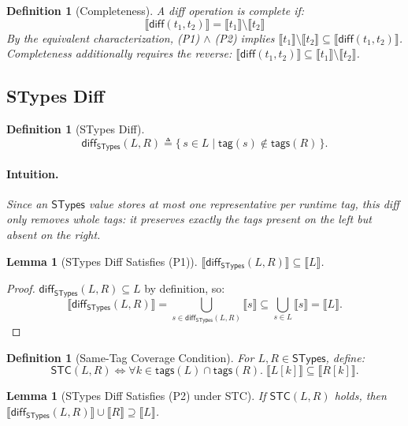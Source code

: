 \documentclass[11pt]{article}
\newtheorem{lemma}[theorem]{Lemma}
\newtheorem{definition}[theorem]{Definition}
\newcommand{\sem}[1]{\llbracket #1 \rrbracket}
\newcommand{\diff}{\mathsf{diff}}
\newcommand{\STypes}{\mathsf{STypes}}
\newcommand{\tagfn}{\mathsf{tag}}
\newcommand{\tags}{\mathsf{tags}}
\begin{document}
\begin{definition}[Completeness]
A diff operation is \emph{complete} if:
\[
\sem{\diff(t_1, t_2)} = \sem{t_1} \setminus \sem{t_2}
\]
By the equivalent characterization, (P1) $\land$ (P2) implies 
$\sem{t_1} \setminus \sem{t_2} \subseteq \sem{\diff(t_1, t_2)}$.
Completeness additionally requires the reverse: $\sem{\diff(t_1, t_2)} \subseteq \sem{t_1} \setminus \sem{t_2}$.
\end{definition}

\subsection{STypes Diff}

\begin{definition}[STypes Diff]
\label{def:stypes-diff}
\[
\diff_{\STypes}(L, R) \triangleq \{\, s \in L \mid \tagfn(s) \notin \tags(R)\,\}.
\]
\paragraph{Intuition.}
Since an $\STypes$ value stores at most one representative per runtime tag, this diff only removes whole tags:
it preserves exactly the tags present on the left but absent on the right.
\end{definition}

\begin{lemma}[STypes Diff Satisfies (P1)]
\label{lem:stypes-diff-p1}
$\sem{\diff_{\STypes}(L, R)} \subseteq \sem{L}$.
\end{lemma}

\begin{proof}
\(\diff_{\STypes}(L,R) \subseteq L\) by definition, so:
\[
\sem{\diff_{\STypes}(L,R)}
= \bigcup_{s \in \diff_{\STypes}(L,R)} \sem{s}
\subseteq \bigcup_{s \in L} \sem{s}
= \sem{L}.
\]
\end{proof}

\begin{definition}[Same-Tag Coverage Condition]
\label{def:stc}
For $L, R \in \STypes$, define:
\[
\mathsf{STC}(L, R) \iff \forall k \in \tags(L) \cap \tags(R).\; \sem{L[k]} \subseteq \sem{R[k]}.
\]
\end{definition}

\begin{lemma}[STypes Diff Satisfies (P2) under STC]
\label{lem:stypes-diff-p2-under-stc}
If $\mathsf{STC}(L, R)$ holds, then $\sem{\diff_{\STypes}(L, R)} \cup \sem{R} \supseteq \sem{L}$.
\end{lemma}
\end{document}
